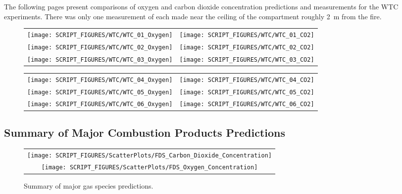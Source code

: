The following pages present comparisons of oxygen and carbon dioxide concentration predictions and measurements for the
WTC experiments. There was only one measurement of each made near the ceiling of the compartment roughly 2~m from the fire.


\begin{figure}[h]
\begin{tabular*}{\textwidth}{l@{\extracolsep{\fill}}r}
\texttt{[image: SCRIPT\_FIGURES/WTC/WTC\_01\_Oxygen]} &
\texttt{[image: SCRIPT\_FIGURES/WTC/WTC\_01\_CO2]} \\
\texttt{[image: SCRIPT\_FIGURES/WTC/WTC\_02\_Oxygen]} &
\texttt{[image: SCRIPT\_FIGURES/WTC/WTC\_02\_CO2]} \\
\texttt{[image: SCRIPT\_FIGURES/WTC/WTC\_03\_Oxygen]} &
\texttt{[image: SCRIPT\_FIGURES/WTC/WTC\_03\_CO2]}
\end{tabular*}
\label{NIST_WTC_Oxygen_CO2_1}
\end{figure}

\newpage

\begin{figure}[p]
\begin{tabular*}{\textwidth}{l@{\extracolsep{\fill}}r}
\texttt{[image: SCRIPT\_FIGURES/WTC/WTC\_04\_Oxygen]} &
\texttt{[image: SCRIPT\_FIGURES/WTC/WTC\_04\_CO2]} \\
\texttt{[image: SCRIPT\_FIGURES/WTC/WTC\_05\_Oxygen]} &
\texttt{[image: SCRIPT\_FIGURES/WTC/WTC\_05\_CO2]} \\
\texttt{[image: SCRIPT\_FIGURES/WTC/WTC\_06\_Oxygen]} &
\texttt{[image: SCRIPT\_FIGURES/WTC/WTC\_06\_CO2]}
\end{tabular*}
\label{NIST_WTC_Oxygen_CO2_2}
\end{figure}

\clearpage


\subsection{Summary of Major Combustion Products Predictions}
\label{Carbon Dioxide Concentration}
\label{Oxygen Concentration}


\begin{figure}[!h]
\centering
\begin{tabular}{c}
\texttt{[image: SCRIPT\_FIGURES/ScatterPlots/FDS\_Carbon\_Dioxide\_Concentration]} \\
\texttt{[image: SCRIPT\_FIGURES/ScatterPlots/FDS\_Oxygen\_Concentration]}
\end{tabular}
\caption[Summary of major gas species predictions]
{Summary of major gas species predictions.}
\end{figure}

